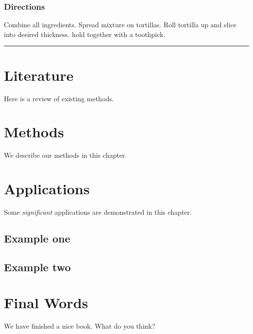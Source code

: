 \documentclass[
]{book}
\begin{document}
\hypertarget{directions-10}{%
\subsection*{Directions}\label{directions-10}}

Combine all ingredients. Spread mixture on tortillas. Roll tortilla up and slice into desired thickness.
hold together with a toothpick.

\begin{center}\rule{0.5\linewidth}{0.5pt}\end{center}

\hypertarget{literature}{%
\chapter{Literature}\label{literature}}

Here is a review of existing methods.

\hypertarget{methods}{%
\chapter{Methods}\label{methods}}

We describe our methods in this chapter.

\hypertarget{applications}{%
\chapter{Applications}\label{applications}}

Some \emph{significant} applications are demonstrated in this chapter.

\hypertarget{example-one}{%
\section{Example one}\label{example-one}}

\hypertarget{example-two}{%
\section{Example two}\label{example-two}}

\hypertarget{final-words}{%
\chapter{Final Words}\label{final-words}}

We have finished a nice book. What do you think?
\end{document}
